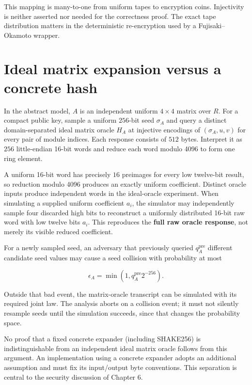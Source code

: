 \documentclass[
  11pt,
  a4paper,
  oneside]{report}
\begin{document}
This mapping is many-to-one from uniform tapes to encryption coins.
Injectivity is neither asserted nor needed for the correctness proof.
The exact tape distribution matters in the deterministic re-encryption
used by a Fujisaki--Okamoto wrapper.

\section{Ideal matrix expansion versus a concrete
hash}\label{ideal-matrix-expansion-versus-a-concrete-hash}

In the abstract model, \(A\) is an independent uniform \(4\times4\)
matrix over \(R\). For a compact public key, sample a uniform
\(256\)-bit seed \(\sigma_A\) and query a distinct domain-separated
ideal matrix oracle \(H_A\) at injective encodings of \((\sigma_A,u,v)\)
for every pair of module indices. Each response consists of \(512\)
bytes. Interpret it as \(256\) little-endian 16-bit words and reduce
each word modulo 4096 to form one ring element.

A uniform 16-bit word has precisely \(16\) preimages for every low
twelve-bit result, so reduction modulo 4096 produces an exactly uniform
coefficient. Distinct oracle inputs produce independent words in the
ideal-oracle experiment. When simulating a supplied uniform coefficient
\(a_i\), the simulator may independently sample four discarded high bits
to reconstruct a uniformly distributed 16-bit raw word with low twelve
bits \(a_i\). This reproduces the \textbf{full raw oracle response}, not
merely its visible reduced coefficient.

For a newly sampled seed, an adversary that previously queried
\(q_A^{\mathrm{pre}}\) different candidate seed values may cause a seed
collision with probability at most

\[
\epsilon_A=\min(1,q_A^{\mathrm{pre}}2^{-256}).
\]

Outside that bad event, the matrix-oracle transcript can be simulated
with its required joint law. The analysis aborts on a collision event;
it must not silently resample seeds until the simulation succeeds, since
that changes the probability space.

No proof that a fixed concrete expander (including SHAKE256) is
indistinguishable from an independent ideal matrix oracle follows from
this argument. An implementation using a concrete expander adopts an
additional assumption and must fix its input/output byte conventions.
This separation is central to the security discussion of Chapter 6.
\end{document}
